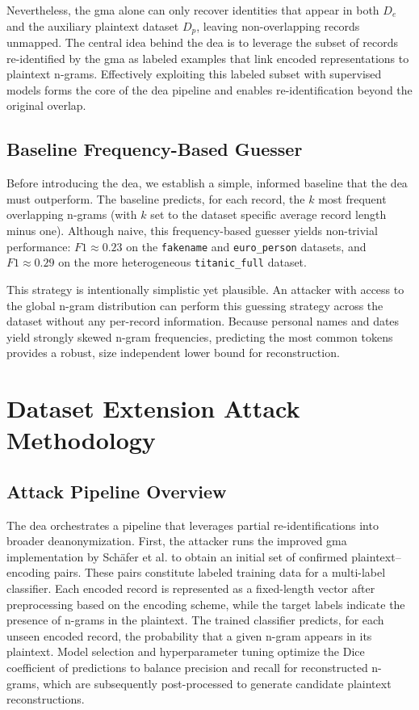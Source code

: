 \documentclass[a4paper,11pt]{scrartcl}
\begin{document}
Nevertheless, the \ac{gma} alone can only recover identities that appear in both $D_e$ and the auxiliary plaintext dataset $D_p$, leaving non-overlapping records unmapped. 
The central idea behind the \ac{dea} is to leverage the subset of records re-identified by the \ac{gma} as labeled examples that link encoded representations to plaintext n-grams. 
Effectively exploiting this labeled subset with supervised models forms the core of the \ac{dea} pipeline and enables re-identification beyond the original overlap.

\subsection{Baseline Frequency-Based Guesser}
Before introducing the \ac{dea}, we establish a simple, informed baseline that the \ac{dea} must outperform. 
The baseline predicts, for each record, the $k$ most frequent overlapping n-grams (with $k$ set to the dataset specific average record length minus one). 
Although naive, this frequency-based guesser yields non-trivial performance: $F1 \approx 0.23$ on the \texttt{fakename} and \texttt{euro\_person} datasets, and $F1 \approx 0.29$ on the more heterogeneous \texttt{titanic\_full} dataset.

This strategy is intentionally simplistic yet plausible. 
An attacker with access to the global n-gram distribution can perform this guessing strategy across the dataset without any per-record information. 
Because personal names and dates yield strongly skewed n-gram frequencies, predicting the most common tokens provides a robust, size independent lower bound for reconstruction.

\section{Dataset Extension Attack Methodology}

\subsection{Attack Pipeline Overview}
The \ac{dea} orchestrates a pipeline that leverages partial re-identifications into broader deanonymization. 
First, the attacker runs the improved \ac{gma} implementation by Schäfer et al. to obtain an initial set of confirmed plaintext–encoding pairs. 
These pairs constitute labeled training data for a multi-label classifier. 
Each encoded record is represented as a fixed-length vector after preprocessing based on the encoding scheme, while the target labels indicate the presence of n-grams in the plaintext. 
The trained classifier predicts, for each unseen encoded record, the probability that a given n-gram appears in its plaintext.
Model selection and hyperparameter tuning optimize the Dice coefficient of predictions to balance precision and recall for reconstructed n-grams, which are subsequently post-processed to generate candidate plaintext reconstructions.
\end{document}
